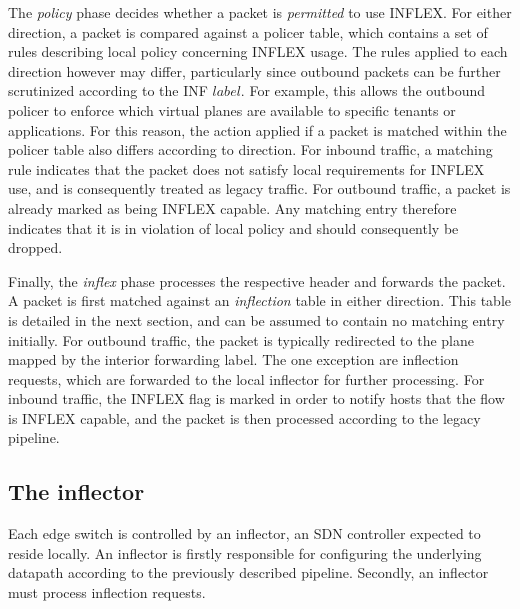 The \emph{policy} phase decides whether a packet is \emph{permitted} to use INFLEX.
For either direction, a packet is compared against a policer table, which contains a set of rules describing local policy concerning INFLEX usage.
The rules applied to each direction however may differ, particularly since outbound packets can be further scrutinized according to the INF $label$.
For example, this allows the outbound policer to enforce which virtual planes are available to specific tenants or applications.
For this reason, the action applied if a packet is matched within the policer table also differs according to direction.
For inbound traffic, a matching rule indicates that the packet does not satisfy local requirements for INFLEX use, and is consequently treated as legacy traffic.
For outbound traffic, a packet is already marked as being INFLEX capable.
Any matching entry therefore indicates that it is in violation of local policy and should consequently be dropped.

Finally, the \emph{inflex} phase processes the respective header and forwards the packet.
A packet is first matched against an \emph{inflection} table in either direction.
This table is detailed in the next section, and can be assumed to contain no matching entry initially.
For outbound traffic, the packet is typically redirected to the  plane mapped by the interior forwarding label.
The one exception are inflection requests, which are forwarded to the local inflector for further processing.
For inbound traffic, the INFLEX flag is marked in order to notify hosts that the flow is INFLEX capable, and the packet is then processed according to the legacy pipeline.

\subsection{The inflector}

Each edge switch is controlled by an inflector, an \ac{SDN} controller expected to reside locally.
An inflector is firstly responsible for configuring the underlying datapath according to the previously described pipeline.
Secondly, an inflector must process inflection requests.

